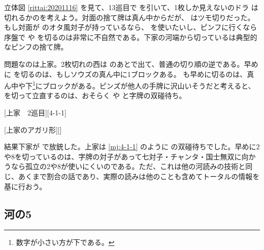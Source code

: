 \documentclass[../nankiru_main.tex]{subfiles}
\begin{document}
\begin{rittai}[h]
  \centering
  
  
  \caption{Mリーグ2020 11/16 第2回戦 南2局 2本場（ツモ切り暗転なし）\citep[][p.~45]{muhai}}
  \label{rittai:20201116}
\end{rittai}

立体図 \ref{rittai:20201116} を見て、13巡目で  を引いて、1枚しか見えないのドラ  は切れるかのを考えよう。対面の捨て牌は真ん中からだが、 はツモ切りだった。もし対面が  のオタ風対子が持っているなら、 を使いたいし、ピンフに行くなら序盤で  や  を切るのは非常に不自然である。下家の河端から切っているは典型的なピンフの捨て牌。

問題なのは上家。2枚切れの西は  のあとで出て、普通の切り順の逆である。早めに  を切るのは、もしソウズの真ん中に1ブロックある。 も早めに切るのは、真ん中や下\footnote{数字が小さい方が下である。}にブロックがある。ピンズが他人の手牌に沢山いそうだと考えると、 を切って立直するのは、おそらく  や  と字牌の双碰待ち。

[上家　2巡目][4-1-1]

[上家のアガリ形][]

結果下家が  で放銃した。上家は \ref{mj:4-1-1} のように  の双碰待ちでした。早めに2や8を切っているのは、字牌の対子があって七対子・チャンタ・国士無双に向かうなら孤立の2や8が使いにくいのである。ただ、これは他の河読みの技術と同じ、あくまで割合の話であり、実際の読みは他のことも含めてトータルの情報を基に行おう。

\subsection{河の5}
\end{document}
